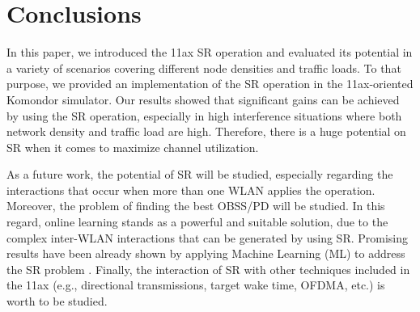 \documentclass[conference]{IEEEtran}
\begin{document}
	\section{Conclusions}
	In this paper, we introduced the 11ax SR operation and evaluated its potential in a variety of scenarios covering different node densities and traffic loads. To that purpose, we provided an implementation of the SR operation in the 11ax-oriented Komondor simulator. Our results showed that significant gains can be achieved by using the SR operation, especially in high interference situations where both network density and traffic load are high. Therefore, there is a huge potential on SR when it comes to maximize channel utilization.
	
	As a future work, the potential of SR will be studied, especially regarding the interactions that occur when more than one WLAN applies the operation. Moreover, the problem of finding the best OBSS/PD will be studied. In this regard, online learning stands as a powerful and suitable solution, due to the complex inter-WLAN interactions that can be generated by using SR. Promising results have been already shown by applying Machine Learning (ML) to address the SR problem \cite{collaborative, potential}. Finally, the interaction of SR with other techniques included in the 11ax (e.g., directional transmissions, target wake time, OFDMA, etc.) is worth to be studied. 
	
\end{document}
